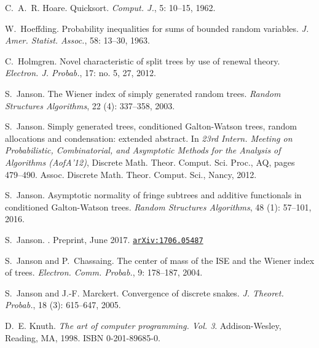 \documentclass[11pt]{article}
\numberwithin{theorem}{section}
\theoremstyle{definition}
\numberwithin{equation}{section}
\begin{document}
\begin{thebibliography}{55}
C.~A.~R. Hoare.
\newblock Quicksort.
\newblock \emph{Comput. J.}, 5: 10--15, 1962.

W.~Hoeffding.
\newblock Probability inequalities for sums of bounded random variables.
\newblock \emph{J. Amer. Statist. Assoc.}, 58: 13--30, 1963.

C.~Holmgren.
\newblock Novel characteristic of split trees by use of renewal theory.
\newblock \emph{Electron. J. Probab.}, 17: no. 5, 27, 2012.

S.~Janson.
\newblock The {W}iener index of simply generated random trees.
\newblock \emph{Random Structures Algorithms}, 22 (4):
  337--358, 2003.

S.~Janson.
\newblock Simply generated trees, conditioned {G}alton-{W}atson trees, random
  allocations and condensation: extended abstract.
\newblock In \emph{23rd {I}ntern. {M}eeting on {P}robabilistic,
  {C}ombinatorial, and {A}symptotic {M}ethods for the {A}nalysis of
  {A}lgorithms ({A}of{A}'12)}, Discrete Math. Theor. Comput. Sci. Proc., AQ,
  pages 479--490. Assoc. Discrete Math. Theor. Comput. Sci., Nancy, 2012.

S.~Janson.
\newblock Asymptotic normality of fringe subtrees and additive functionals in
  conditioned {G}alton-{W}atson trees.
\newblock \emph{Random Structures Algorithms}, 48 (1):
  57--101, 2016.

S.~{Janson}.
.
\newblock Preprint, June 2017.
\href{https://arxiv.org/abs/1706.05487}{\nolinkurl{arXiv:1706.05487}}

S.~Janson and P.~Chassaing.
\newblock The center of mass of the {ISE} and the {W}iener index of trees.
\newblock \emph{Electron. Comm. Probab.}, 9: 178--187, 2004.

S.~Janson and J.-F. Marckert.
\newblock Convergence of discrete snakes.
\newblock \emph{J. Theoret. Probab.}, 18 (3): 615--647, 2005.

D.~E. Knuth.
\newblock \emph{The art of computer programming. {V}ol. 3}.
\newblock Addison-Wesley, Reading, MA, 1998.
\newblock ISBN 0-201-89685-0.


\end{thebibliography}
\end{document}
